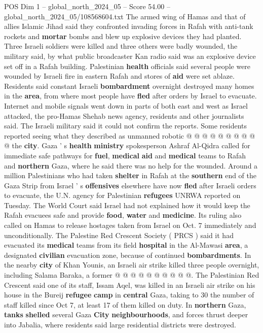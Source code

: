 \begin{textsample}{POS Dim 1 – global\_north\_2024\_05 – Score 54.00 – global\_north\_2024\_05/108568604.txt}
The armed wing of Hamas and that of allies Islamic Jihad said they confronted invading forces in Rafah with anti-tank rockets and \textbf{mortar} bombs and blew up explosive devices they had planted.
Three Israeli soldiers were killed and three others were badly wounded, the military said, by what public broadcaster Kan radio said was an explosive device set off in a Rafah building.
Palestinian \textbf{health} officials said several people were wounded by Israeli fire in eastern Rafah and stores of \textbf{aid} were set ablaze.
Residents said constant Israeli \textbf{bombardment} overnight destroyed many homes in the \textbf{area}, from where most people have \textbf{fled} after orders by Israel to evacuate.
Internet and mobile signals went down in parts of both east and west as Israel attacked, the pro-Hamas Shehab news agency, residents and other journalists said.
The Israeli military said it could not confirm the reports.
Some residents reported seeing what they described as unmanned robotic @ @ @ @ @ @ @ @ @ @ the \textbf{city}.
Gaza ' s \textbf{health} \textbf{ministry} spokesperson Ashraf Al-Qidra called for immediate safe pathways for \textbf{fuel}, \textbf{medical} \textbf{aid} and \textbf{medical} teams to Rafah and \textbf{northern} Gaza, where he said there was no help for the wounded.
Around a million Palestinians who had taken \textbf{shelter} in Rafah at the \textbf{southern} end of the Gaza Strip from Israel ' s \textbf{offensives} elsewhere have now \textbf{fled} after Israeli orders to evacuate, the U.N. agency for Palestinian \textbf{refugees} UNRWA reported on Tuesday.
The World Court said Israel had not explained how it would keep the Rafah evacuees safe and provide \textbf{food}, \textbf{water} and \textbf{medicine}.
Its ruling also called on Hamas to release hostages taken from Israel on Oct. 7 immediately and unconditionally.
The Palestine Red Crescent Society ( PRCS ) said it had evacuated its \textbf{medical} teams from its field \textbf{hospital} in the Al-Mawasi \textbf{area}, a designated \textbf{civilian} evacuation zone, because of continued \textbf{bombardments}.
In the nearby \textbf{city} of Khan Younis, an Israeli air strike killed three people overnight, including Salama Baraka, a former @ @ @ @ @ @ @ @ @ @.
The Palestinian Red Crescent said one of its staff, Issam Aqel, was killed in an Israeli air strike on his house in the Bureij \textbf{refugee} \textbf{camp} in \textbf{central} Gaza, taking to 30 the number of staff killed since Oct 7, at least 17 of them killed on duty.
In \textbf{northern} Gaza, \textbf{tanks} \textbf{shelled} several Gaza \textbf{City} \textbf{neighbourhoods}, and forces thrust deeper into Jabalia, where residents said large residential districts were destroyed.

\end{textsample}
